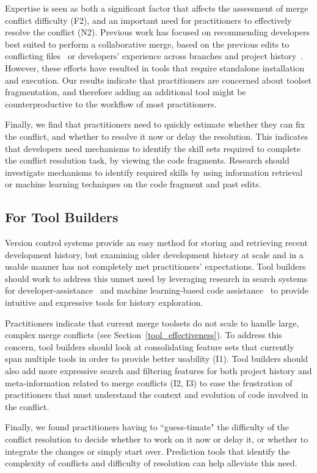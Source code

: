 Expertise is seen as both a significant factor that affects the assessment of merge conflict difficulty (F2), and an important need for practitioners to effectively resolve the conflict (N2).
Previous work has focused on recommending developers best suited to perform a collaborative merge, based on the previous edits to conflicting files~\cite{dasilva2015niche} or developers' experience across branches and project history~\cite{CostaSarma}. 
However, these efforts have resulted in tools that require standalone installation and execution. 
Our results indicate that practitioners are concerned about toolset fragmentation, and therefore adding an additional tool might be counterproductive to the workflow of most practitioners. 

Finally, we find that practitioners need to quickly estimate whether they can fix the conflict, and whether to resolve it now or delay the resolution. 
This indicates that developers need mechanisms to identify the skill sets required to complete the conflict resolution task, by viewing the code fragments.
Research should investigate mechanisms to identify required skills by using information retrieval or machine learning techniques on the code fragment and past edits.

\subsection{For Tool Builders}
Version control systems provide an easy method for storing and retrieving recent development history, but examining older development history at scale and in a usable manner has not completely met practitioners' expectations.
Tool builders should work to address this unmet need by leveraging research in search systems for developer-assistance~\cite{nabi2016putting} and machine learning-based code assistance~\cite{bradley2011history_exploration} to provide intuitive and expressive tools for history exploration.

Practitioners indicate that current merge toolsets do not scale to handle large, complex merge conflicts (see Section~\ref{tool_effectiveness}).
To address this concern, tool builders should look at consolidating feature sets that currently span multiple tools in order to provide better usability (I1).
Tool builders should also add more expressive search and filtering features for both project history and meta-information related to merge conflicts (I2, I3) to ease the frustration of practitioners that must understand the context and evolution of code involved in the conflict.

Finally, we found practitioners having to ``guess-timate" the difficulty of the conflict resolution to decide whether to work on it now or delay it, or whether to integrate the changes or simply start over. Prediction tools that identify the complexity of conflicts and difficulty of resolution can help alleviate this need.